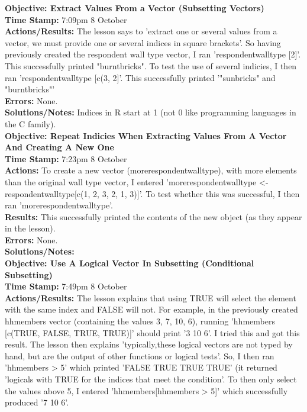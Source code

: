 \documentclass{article}
\begin{document}
\begin{FlushLeft}
\vspace{5mm}
\textbf{Objective: Extract Values From a Vector (Subsetting Vectors)}\\ 
\textbf{Time Stamp:} 7:09pm 8 October\\
\textbf{Actions/Results:} The lesson says to 'extract one or several values from a vector, we must provide one or several indices in square brackets'. So having previously created the respondent wall type vector, I ran 'respondent\textunderscore wall\textunderscore type [2]'. This successfully printed "burntbricks". To test the use of several indicies, I then ran 'respondent\textunderscore wall\textunderscore type [c(3, 2]'. This successfully printed '"sunbricks" and "burntbricks"'\\
\textbf{Errors:} None.\\
\textbf{Solutions/Notes:} Indices in R start at 1 (not 0 like programming languages in the C family).\\
\vspace{5mm}
\textbf{Objective: Repeat Indicies When Extracting Values From A Vector And Creating A New One}\\ 
\textbf{Time Stamp:} 7:23pm 8 October\\
\textbf{Actions:} To create a new vector (more\textunderscore respondent\textunderscore wall\textunderscore type), with more elements than the original wall type vector, I entered 'more\textunderscore respondent\textunderscore wall\textunderscore type \textless - respondent\textunderscore wall\textunderscore type[c(1, 2, 3, 2, 1, 3)]'. To test whether this was successful, I then ran 'more\textunderscore respondent\textunderscore wall\textunderscore type'.\\
\textbf{Results:} This successfully printed the contents of the new object (as they appear in the lesson).\\
\textbf{Errors:} None.\\
\textbf{Solutions/Notes:}\\
\vspace{5mm}
\textbf{Objective: Use A Logical Vector In Subsetting (Conditional Subsetting)}\\ 
\textbf{Time Stamp:} 7:49pm 8 October\\
\textbf{Actions/Results:} The lesson explains that using TRUE will select the element with the same index and FALSE will not. For example, in the previously created hh\textunderscore members vector (containing the values 3, 7, 10, 6), running 'hh\textunderscore members [c(TRUE, FALSE, TRUE, TRUE)]' should print '3 10 6'. I tried this and got this result. The lesson then explains 'typically,these logical vectors are not typed by hand, but are the output of other functions or logical tests'. So, I then ran 'hh\textunderscore members \textgreater{} 5' which printed 'FALSE TRUE TRUE TRUE' (it returned 'logicals with TRUE for the indices that meet the condition'. To then only select the values above 5, I entered 'hh\textunderscore members[hh\textunderscore members \textgreater{} 5]' which successfully produced '7 10 6'.\\

\end{FlushLeft}
\end{document}
